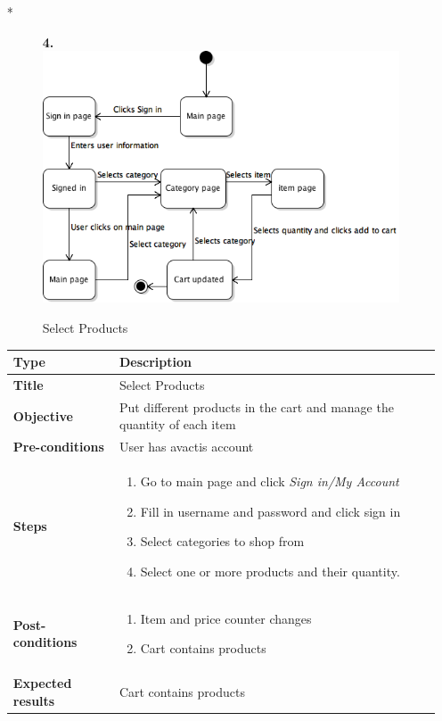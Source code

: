 \documentclass[UKenglish,12pt]{article}
\begin{document}
\begin{itemize}
\item[*]
\begin{figure}[!htbp]
\textbf{4.\newline}
\centering
\includegraphics[scale=0.7,keepaspectratio]{Images/SelectProducts.png}
\caption{Select Products}
\end{figure}


\begin{table}[!htbp]
\small
\begin{tabular}{| p{5cm} | p{10cm} | }
	\hline
	\textbf{Type} & \textbf{Description} \\ \hline
	 \textbf{Title} & Select Products \\ \hline
	 \textbf{Objective} & Put different products in the cart and manage the quantity of each item \\ \hline
	 \textbf{Pre-conditions} & User has avactis account \\ \hline
	 \textbf{Steps} & \begin{enumerate} \item Go to main page and click \textit{Sign in/My Account} \item Fill in username and password and click sign in \item Select categories to shop from \item Select one or more products and their quantity.
	 \end{enumerate} \\ \hline
	 \textbf{Post-conditions} & \begin{enumerate} \item Item and price counter changes \item Cart contains products \end{enumerate}  \\ \hline
	 \textbf{Expected results} & Cart contains products \\ 
	 \hline
\end{tabular} %
\end{table}



\end{itemize}
\end{document}

